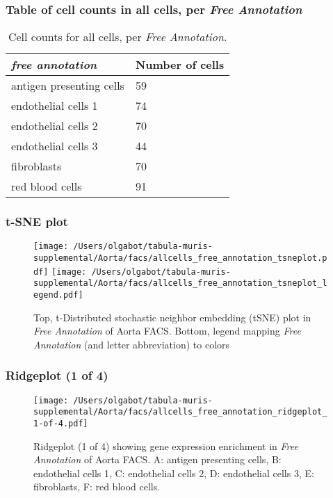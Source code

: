 \subsubsection{Table of cell counts in all cells, per \emph{Free Annotation}}\begin{table}[h]
\centering
\label{my-label}
\begin{tabular}{@{}ll@{}}
\toprule

\emph{free annotation}& Number of cells \\ \midrule
antigen presenting cells & 59 \\

endothelial cells 1 & 74 \\

endothelial cells 2 & 70 \\

endothelial cells 3 & 44 \\

fibroblasts & 70 \\

red blood cells & 91 \\
\bottomrule
\end{tabular}
\caption{Cell counts for all cells, per \emph{Free Annotation}.}
\end{table}

\clearpage
\subsubsection{t-SNE plot}
\begin{figure}[h]
\centering
\texttt{[image: /Users/olgabot/tabula-muris-supplemental/Aorta/facs/allcells\_free\_annotation\_tsneplot.pdf]}
\texttt{[image: /Users/olgabot/tabula-muris-supplemental/Aorta/facs/allcells\_free\_annotation\_tsneplot\_legend.pdf]}
\caption{Top, t-Distributed stochastic neighbor embedding (tSNE) plot  in \emph{Free Annotation} of Aorta FACS. Bottom, legend mapping \emph{Free Annotation} (and letter abbreviation) to colors}
\end{figure}


\clearpage
\subsubsection{Ridgeplot (1 of 4)}
\begin{figure}[h]
\centering
\texttt{[image: /Users/olgabot/tabula-muris-supplemental/Aorta/facs/allcells\_free\_annotation\_ridgeplot\_1-of-4.pdf]}

\caption{ Ridgeplot (1 of 4)  showing gene expression enrichment in \emph{Free Annotation} of Aorta FACS. A: antigen presenting cells, B: endothelial cells 1, C: endothelial cells 2, D: endothelial cells 3, E: fibroblasts, F: red blood cells.}
\end{figure}


